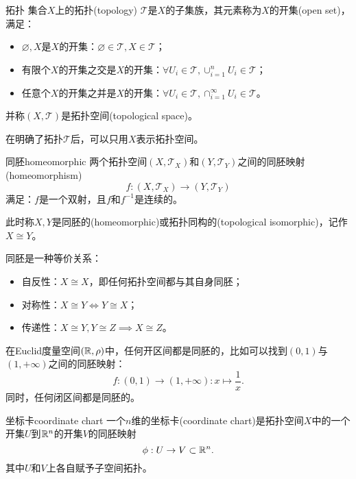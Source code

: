 \begin{definition}{拓扑}{}
    集合$X$上的拓扑(topology) $\mathcal T$是$X$的子集族，其元素称为$X$的开集(open set)，满足：
    \begin{itemize}
        \item $\varnothing,X$是$X$的开集：$\varnothing\in\mathcal T,X\in\mathcal T$；
        \item 有限个$X$的开集之交是$X$的开集：$\forall U_i\in\mathcal T,\cup_{i=1}^nU_i\in\mathcal T$；
        \item 任意个$X$的开集之并是$X$的开集：$\forall U_i\in\mathcal T,\cap_{i=1}^\infty U_i\in\mathcal T$。
    \end{itemize}
    并称$(X,\mathcal T)$是拓扑空间(topological space)。
\end{definition}
在明确了拓扑$\mathcal T$后，可以只用$X$表示拓扑空间。
\begin{definition}{同胚}{homeomorphic}
    两个拓扑空间$(X,\mathcal T_X)$和$(Y,\mathcal T_Y)$之间的同胚映射(homeomorphism)
    \begin{equation}
        f:(X,\mathcal T_X)\to(Y,\mathcal T_Y)
    \end{equation}
    满足：$f$是一个双射，且$f$和$f^{-1}$是连续的。
    
    此时称$X,Y$是同胚的(homeomorphic)或拓扑同构的(topological isomorphic)，记作$X\cong Y$。
\end{definition}
\begin{theorem}{}{}
    同胚是一种等价关系：
    \begin{itemize}
        \item 自反性：$X\cong X$，即任何拓扑空间都与其自身同胚；
        \item 对称性：$X\cong Y\iff Y\cong X$；
        \item 传递性：$X\cong Y,Y\cong Z\implies X\cong Z$。
    \end{itemize}
\end{theorem}
\begin{example}{}{}
    在Euclid度量空间$(\mathbb R,\rho)$中，任何开区间都是同胚的，比如可以找到$(0,1)$与$(1,+\infty)$之间的同胚映射：
    \[
        f:(0,1)\to(1,+\infty):x\mapsto\frac1x.
    \]
    同时，任何闭区间都是同胚的。
\end{example}
\begin{definition}{坐标卡}{coordinate chart}
    一个$n$维的坐标卡(coordinate chart)是拓扑空间$X$中的一个开集$U$到$\mathbb R^n$的开集$V$的同胚映射
    \begin{equation}
        \phi:U\to V\subset\mathbb R^n.
    \end{equation}
    其中$U$和$V$上各自赋予子空间拓扑。
\end{definition}
